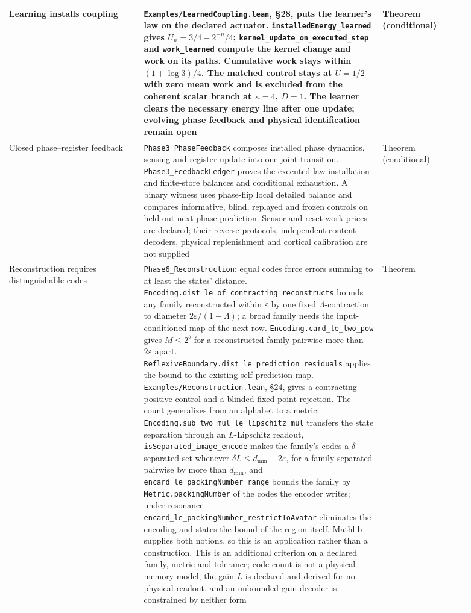 \documentclass{article}
\begin{document}
\begin{longtable}{|>{\raggedright\arraybackslash}p{0.26\linewidth}|>{\raggedright\arraybackslash}p{0.46\linewidth}|>{\raggedright\arraybackslash}p{0.17\linewidth}|}
Learning installs coupling & \nolinkurl{Examples/LearnedCoupling.lean}, \S28, puts the learner's law on the declared actuator. \nolinkurl{installedEnergy_learned} gives $U_n=3/4-2^{-n}/4$; \nolinkurl{kernel_update_on_executed_step} and \nolinkurl{work_learned} compute the kernel change and work on its paths. Cumulative work stays within $(1+\log3)/4$. The matched control stays at $U=1/2$ with zero mean work and is excluded from the coherent scalar branch at $\kappa=4$, $D=1$. The learner clears the necessary energy line after one update; evolving phase feedback and physical identification remain open & Theorem (conditional) \\ \hline
Closed phase--register feedback & \nolinkurl{Phase3_PhaseFeedback} composes installed phase dynamics, sensing and register update into one joint transition. \nolinkurl{Phase3_FeedbackLedger} proves the executed-law installation and finite-store balances and conditional exhaustion. A binary witness uses phase-flip local detailed balance and compares informative, blind, replayed and frozen controls on held-out next-phase prediction. Sensor and reset work prices are declared; their reverse protocols, independent content decoders, physical replenishment and cortical calibration are not supplied & Theorem (conditional) \\ \hline
Reconstruction requires distinguishable codes & \nolinkurl{Phase6_Reconstruction}: equal codes force errors summing to at least the states' distance. \nolinkurl{Encoding.dist_le_of_contracting_reconstructs} bounds any family reconstructed within $\varepsilon$ by one fixed $\Lambda$-contraction to diameter $2\varepsilon/(1-\Lambda)$; a broad family needs the input-conditioned map of the next row. \nolinkurl{Encoding.card_le_two_pow} gives $M\leq2^b$ for a reconstructed family pairwise more than $2\varepsilon$ apart. \nolinkurl{ReflexiveBoundary.dist_le_prediction_residuals} applies the bound to the existing self-prediction map. \nolinkurl{Examples/Reconstruction.lean}, \S24, gives a contracting positive control and a blinded fixed-point rejection. The count generalizes from an alphabet to a metric: \nolinkurl{Encoding.sub_two_mul_le_lipschitz_mul} transfers the state separation through an $L$-Lipschitz readout, \nolinkurl{isSeparated_image_encode} makes the family's codes a $\delta$-separated set whenever $\delta L\leq d_{\min}-2\varepsilon$, for a family separated pairwise by more than $d_{\min}$, and \nolinkurl{encard_le_packingNumber_range} bounds the family by \nolinkurl{Metric.packingNumber} of the codes the encoder writes; under resonance \nolinkurl{encard_le_packingNumber_restrictToAvatar} eliminates the encoding and states the bound of the region itself. Mathlib supplies both notions, so this is an application rather than a construction. This is an additional criterion on a declared family, metric and tolerance; code count is not a physical memory model, the gain $L$ is declared and derived for no physical readout, and an unbounded-gain decoder is constrained by neither form & Theorem \\ \hline

\end{longtable}
\end{document}
